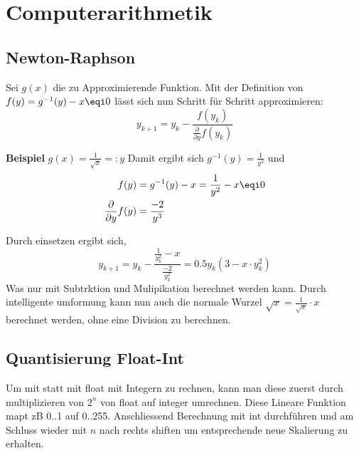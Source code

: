 \section{Computerarithmetik}
\subsection{Newton-Raphson}
Sei $g(x)$ die zu Approximierende Funktion. Mit der Definition von $f(y) = g^{-1}(y) - x \eqi 0$ lässt sich nun Schritt für Schritt approximieren:
\[
y_{k+1} = y_k - \frac{f(y_k)}{\frac{\partial}{\partial y}f(y_k)}
\]

\textbf{Beispiel} $g(x) = \frac{1}{\sqrt{x}} =: y$
Damit ergibt sich $g^{-1}(y) = \frac{1}{y^2}$ und 
\begin{align*}
	f(y) &= g^{-1}(y) - x = \frac{1}{y^2} - x \eqi 0 \\
	\frac{\partial}{\partial y}f(y) &= \frac{-2}{y^3}
\end{align*}

Durch einsetzen ergibt sich,
\[
y_{k+1} = y_k - \frac{\frac{1}{y_k^2} - x}{\frac{-2}{y_k^3}} = 0.5y_k(3 - x\cdot y_k^2)
\]
Was nur mit Subtrktion und Mulipikation berechnet werden kann. Durch intelligente umformung kann nun auch die normale Wurzel $\sqrt{x} = \frac{1}{\sqrt{x}}\cdot x$ berechnet werden, ohne eine Division zu berechnen.

\subsection{Quantisierung Float-Int}
Um mit statt mit float mit Integern zu rechnen, kann man diese zuerst durch multiplizieren von $2^n$ von float auf integer umrechnen. Diese Lineare Funktion mapt zB 0..1 auf 0..255. Anschliessend Berechnung mit int durchführen und am Schluss wieder mit $n$ nach rechts shiften um entsprechende neue Skalierung zu erhalten.